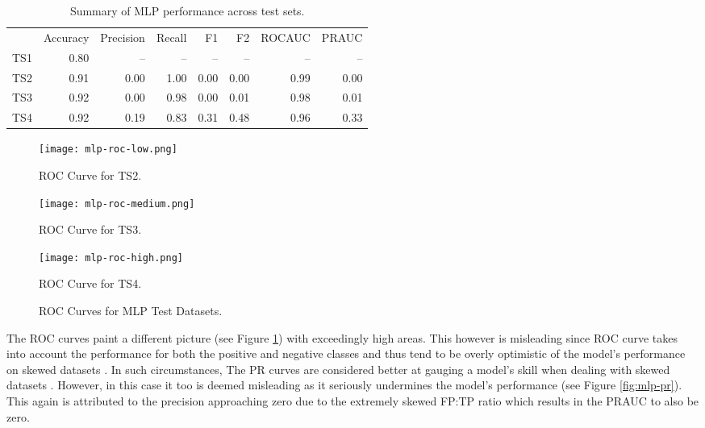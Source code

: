 \begin{table}[htb]
    \centering
    \begin{tabular}{rrrrrrrr}
      \hline
      & Accuracy & Precision & Recall & F1 & F2 & ROCAUC & PRAUC \\
      TS1 & 0.80 & -- & -- & -- & -- & -- & -- \\
      TS2 & 0.91 & 0.00 & 1.00 & 0.00 & 0.00 & 0.99 & 0.00 \\
      TS3 & 0.92 & 0.00 & 0.98 & 0.00 & 0.01 & 0.98 & 0.01 \\
      TS4 & 0.92 & 0.19 & 0.83 & 0.31 & 0.48 & 0.96 & 0.33 \\
      \hline
    \end{tabular}
    \caption{Summary of MLP performance across test sets.}
    \label{tab:mlp-results}
\end{table}

\begin{figure}[htb]
  \centering
  \begin{minipage}{0.32\textwidth}
    \centering
    \texttt{[image: mlp-roc-low.png]}
    \caption{ROC Curve for TS2.}
  \end{minipage}
  \begin{minipage}{0.32\textwidth}
    \centering
    \texttt{[image: mlp-roc-medium.png]}
    \caption{ROC Curve for TS3.}
  \end{minipage}
  \begin{minipage}{0.32\textwidth}
    \centering
    \texttt{[image: mlp-roc-high.png]}
    \caption{ROC Curve for TS4.}
  \end{minipage}
  \caption{ROC Curves for MLP Test Datasets.}
  \label{fig:mlp-roc}
\end{figure}

The ROC curves paint a different picture (see Figure
\ref{fig:mlp-roc}) with exceedingly high areas. This however is
misleading since ROC curve takes into account the performance for both
the positive and negative classes and thus tend to be overly
optimistic of the model's performance on skewed datasets
\cite{branco2015survey,fernandez2018learning}. In such circumstances,
The PR curves are considered better at gauging a model's skill when
dealing with skewed datasets \cite{branco2015survey}. However, in this
case it too is deemed misleading as it seriously undermines the
model's performance (see Figure \ref{fig:mlp-pr}). This again is
attributed to the precision approaching zero due to the extremely
skewed FP:TP ratio which results in the PRAUC to also be zero.

